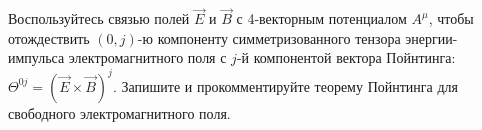 \documentclass[__main__.tex]{subfiles}
\begin{document}
Воспользуйтесь связью полей $\vec{E}$ и $\vec{B}$ с 4-векторным потенциалом $A^\mu$, чтобы отождествить $(0,j)$-ю компоненту симметризованного тензора энергии-импульса электромагнитного поля с $j$-й компонентой вектора Пойнтинга: $\Theta^{0j}=\left(\vec{E}\times\vec{B}\right)^{j}$. Запишите и прокомментируйте теорему Пойнтинга для свободного электромагнитного поля.\\ 

\end{document}
